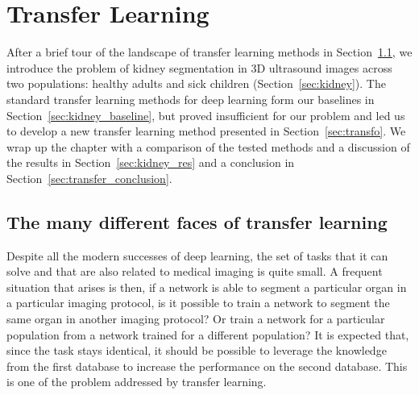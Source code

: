\chapter{Transfer Learning}
\label{chap:transfer}

\begin{chapabstract}
After a brief tour of the landscape of transfer learning methods in Section~\ref{sec:transfer}, we introduce the problem of kidney segmentation in 3D ultrasound images across two populations: healthy adults and sick children (Section~\ref{sec:kidney}). The standard transfer learning methods for deep learning form our baselines in Section~\ref{sec:kidney_baseline}, but proved insufficient for our problem and led us to develop a new transfer learning method presented in Section~\ref{sec:transfo}. We wrap up the chapter with a comparison of the tested methods and a discussion of the results in Section~\ref{sec:kidney_res} and a conclusion in Section~\ref{sec:transfer_conclusion}.
\end{chapabstract}

\vspace{1cm}

\minitoc

\newpage

\section{The many different faces of transfer learning}
\label{sec:transfer}

Despite all the modern successes of deep learning, the set of tasks that it can solve and that are also related to medical imaging is quite small. A frequent situation that arises is then, if a network is able to segment a particular organ in a particular imaging protocol, is it possible to train a network to segment the same organ in another imaging protocol? Or train a network for a particular population from a network trained for a different population? It is expected that, since the task stays identical, it should be possible to leverage the knowledge from the first database to increase the performance on the second database. This is one of the problem addressed by transfer learning.

